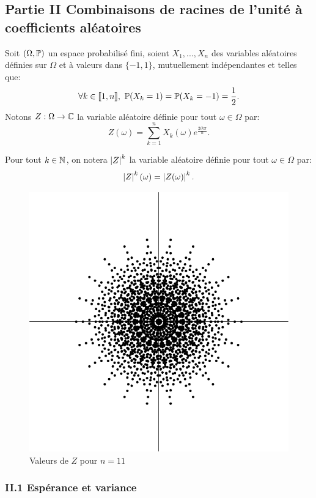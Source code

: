 \subsection*{Partie II Combinaisons de racines de l'unité à coefficients aléatoires}

Soit $(\Omega, \mathbb{P})$ un espace probabilisé fini, soient $X_{1}, ..., X_{n}$ des variables aléatoires définies sur $\Omega$ et à valeurs dans $\{ -1, 1 \}$, mutuellement indépendantes et telles que:
\[ \forall k\in \llbracket 1, n\rrbracket ,\ \p(X_{k} = 1) = \p(X_{k} = -1) = \frac{1}{2}.\]
Notons $Z:\Omega \to \mathbb{C}$ la variable aléatoire définie pour tout $\omega\in \Omega$ par:
\[ Z(\omega) = \sum_{k=1}^{n}X_{k}(\omega)e^{\frac{2ik\pi}{n}}.\]

Pour tout $k\in \mathbb{N}$, on notera $\left\vert Z\right\vert^{k}$ la variable aléatoire définie pour tout $\omega \in \Omega$ par:
\[ \left\vert Z\right\vert^{k}(\omega) = \left\vert Z(\omega)\right\vert^{k}.\]

\begin{figure}[h!]
  \centering
  \includegraphics{Evaleadetcirc_1.pdf}
  \caption{Valeurs de $Z$ pour $n=11$}
  \label{fig:Evaleadetcirc}
\end{figure}


\subsubsection*{II.1 Espérance et variance}

